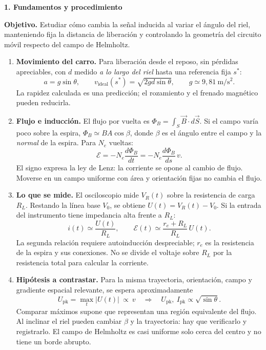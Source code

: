 \documentclass[11pt,letterpaper]{article}
\newcommand{\titulo}[1]{{\Large\bfseries #1}\par\vspace{4pt}}
\newcommand{\subtitulo}[1]{\vspace{5pt}{\bfseries #1}\par}
\begin{document}
\titulo{1. Fundamentos y procedimiento}
\textbf{Objetivo.} Estudiar cómo cambia la señal inducida al variar el ángulo del riel, manteniendo fija la distancia de liberación y controlando la geometría del circuito móvil respecto del campo de Helmholtz.

\subtitulo{Marco teórico simplificado}
\begin{enumerate}
\item \textbf{Movimiento del carro.} Para liberación desde el reposo, sin pérdidas apreciables, con $d$ medido \emph{a lo largo del riel} hasta una referencia fija $s^*$:
\[
 a=g\sin\theta,\qquad v_{\mathrm{ideal}}(s^*)=\sqrt{2gd\sin\theta},
 \qquad g\simeq9{,}81\ \mathrm{m/s^2}.
\]
La rapidez calculada es una predicción; el rozamiento y el frenado magnético pueden reducirla.
\item \textbf{Flujo e inducción.} El flujo por vuelta es $\Phi_B=\int_S\vec B\cdot d\vec S$. Si el campo varía poco sobre la espira, $\Phi_B\simeq BA\cos\beta$, donde $\beta$ es el ángulo entre el campo y la \emph{normal} de la espira. Para $N_e$ vueltas:
\[
 \mathcal E=-N_e\frac{d\Phi_B}{dt}
             =-N_e\frac{d\Phi_B}{ds}\,v.
\]
El signo expresa la ley de Lenz: la corriente se opone al cambio de flujo. Moverse en un campo uniforme con área y orientación fijas no cambia el flujo.
\item \textbf{Lo que se mide.} El osciloscopio mide $V_R(t)$ sobre la resistencia de carga $R_L$. Restando la línea base $V_0$, se obtiene $U(t)=V_R(t)-V_0$. Si la entrada del instrumento tiene impedancia alta frente a $R_L$:
\[
 i(t)\simeq\frac{U(t)}{R_L},\qquad
 \mathcal E(t)\simeq\frac{r_e+R_L}{R_L}\,U(t).
\]
La segunda relación requiere autoinducción despreciable; $r_e$ es la resistencia de la espira y sus conexiones. No se divide el voltaje sobre $R_L$ por la resistencia total para calcular la corriente.
\item \textbf{Hipótesis a contrastar.} Para la misma trayectoria, orientación, campo y gradiente espacial relevante, se espera aproximadamente
\[
 U_{\mathrm{pk}}=\max_t|U(t)|\ \propto\ v
 \quad\Longrightarrow\quad U_{\mathrm{pk}},\ I_{\mathrm{pk}}\propto\sqrt{\sin\theta}.
\]
Comparar máximos supone que representan una región equivalente del flujo. Al inclinar el riel pueden cambiar $\beta$ y la trayectoria: hay que verificarlo y registrarlo. El campo de Helmholtz es casi uniforme solo cerca del centro y no tiene un borde abrupto.
\end{enumerate}
\end{document}
